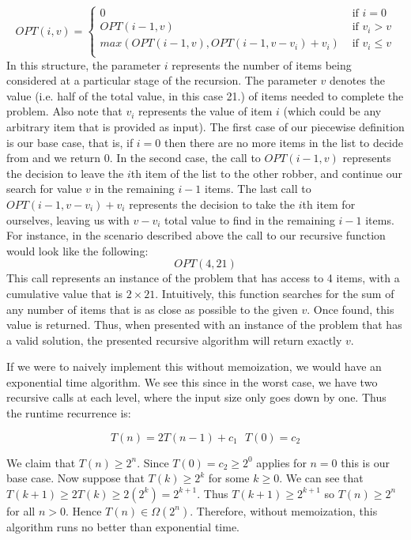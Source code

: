 \documentclass{article}
\begin{document}
\[ OPT(i, v) = \begin{cases} 
	  0 & \textrm{ if $i = 0$}\\
      OPT(i-1, v) & \textrm{ if $v_{i} > v$} \\
      max(OPT(i-1, v), OPT(i-1, v-v_{i}) + v_{i}) & \textrm{ if $v_{i} \leq v$} \\
\end{cases} \]
In this structure, the parameter $i$ represents the number of items being considered at a particular stage of the recursion. The parameter $v$ denotes the value (i.e. half of the total value, in this case 21.) of items needed to complete the problem. Also note that $v_{i}$ represents the value of item $i$ (which could be any arbitrary item that is provided as input). The first case of our piecewise definition is our base case, that is, if $i = 0$ then there are no more items in the list to decide from and we return $0$. In the second case, the call to $OPT(i-1, v)$ represents the decision to leave the $i$th item of the list to the other robber, and continue our search for value $v$ in the remaining $i - 1$ items. The last call to $OPT(i-1, v-v_{i}) + v_{i}$ represents the decision to take the $i$th item for ourselves, leaving us with $v - v_{i}$ total value to find in the remaining $i - 1$ items. For instance, in the scenario described above the call to our recursive function would look like the following:
\begin{equation*}
	OPT(4, 21)
\end{equation*}
This call represents an instance of the problem that has access to 4 items, with a cumulative value that is $2 \times 21$. Intuitively, this function searches for the sum of any number of items that is as close as possible to the given $v$. Once found, this value is returned. Thus, when presented with an instance of the problem that has a valid solution, the presented recursive algorithm will return exactly $v$.

If we were to naively implement this without memoization, we would have an exponential time algorithm.  We see this since in the worst case, we have two recursive calls at each level, where the input size only goes down by one.  Thus the runtime recurrence is:

\[T(n) = 2T(n-1) + c_1 ~~~ T(0) = c_2 \]


We claim that $T(n) \geq 2^{n}$. Since $T(0) = c_2 \geq 2^0$ applies for $n=0$ this is our base case.  Now suppose that $T(k) \geq 2^k$ for some $k \geq 0$.  We can see that  $T(k+1) \geq 2T(k) \geq 2(2^{k}) = 2^{k+1} $. Thus $T(k+1) \geq 2^{k+1}$ so $T(n) \geq 2^n$ for all $n > 0$. Hence $T(n) \in \Omega(2^n)$. Therefore, without memoization, this algorithm runs no better than exponential time.
\end{document}
